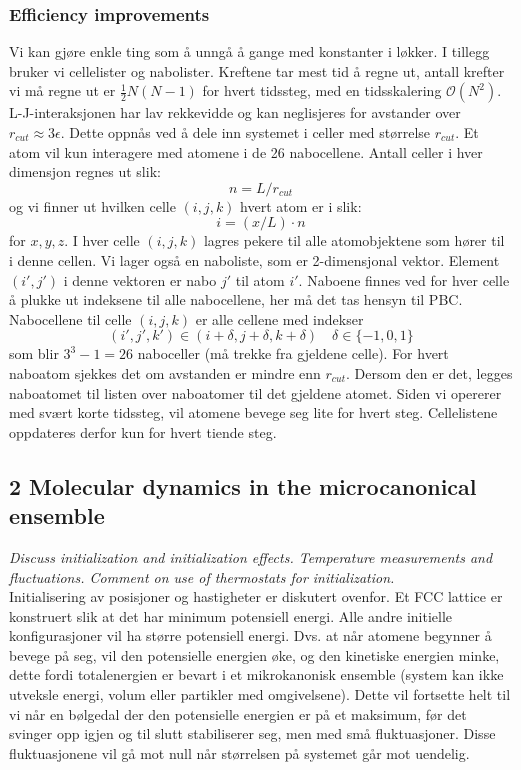 \documentclass[english, a4paper]{article}
\begin{document}
\subsubsection{Efficiency improvements}
Vi kan gjøre enkle ting som å unngå å gange med konstanter i løkker. 
I tillegg bruker vi cellelister og nabolister. Kreftene tar mest tid å regne ut, antall krefter
vi må regne ut er $\frac{1}{2}N(N-1)$ for hvert tidssteg, med en tidsskalering $\mathcal{O}(N^2)$.
L-J-interaksjonen har lav rekkevidde og kan neglisjeres for avstander over $r_{cut} \approx 3\epsilon$.
Dette oppnås ved å dele inn systemet i celler med størrelse $r_{cut}$. Et atom vil kun interagere
med atomene i de 26 nabocellene. Antall celler i hver dimensjon regnes ut slik:
\begin{equation}
 n = L/r_{cut}
\end{equation}
og vi finner ut hvilken celle $(i,j,k)$ hvert atom er i slik:
\begin{equation}
 i = (x/L) \cdot n
\end{equation}
for $x, y, z$. I hver celle $(i,j,k)$ lagres pekere til alle atomobjektene som hører til i denne cellen. 
Vi lager også en naboliste, som er 2-dimensjonal vektor. Element $(i',j')$ i denne vektoren
er nabo $j'$ til atom $i'$. Naboene finnes ved for hver celle å plukke ut indeksene til alle
nabocellene, her må det tas hensyn til PBC. Nabocellene til celle $(i,j,k)$ er alle cellene med indekser
\begin{equation}
 (i',j',k') \in (i + \delta, j + \delta, k + \delta) \quad \delta \in \{-1,0,1\}
\end{equation}
som blir $3^3 - 1  = 26$ naboceller (må trekke fra gjeldene celle). For hvert naboatom
sjekkes det om avstanden er mindre enn $r_{cut}$. Dersom den er det, legges naboatomet til listen 
over naboatomer til det gjeldene atomet. Siden vi opererer med svært korte tidssteg, vil atomene bevege seg
lite for hvert steg. Cellelistene oppdateres derfor kun for hvert tiende steg. 


\subsection{2 Molecular dynamics in the microcanonical ensemble}
\textit{Discuss initialization and initialization effects. Temperature measurements and fluctuations.
Comment on use of thermostats for initialization.} \\

\noindent
Initialisering av posisjoner og hastigheter er diskutert ovenfor. Et FCC lattice er konstruert slik at
det har minimum potensiell energi. Alle andre initielle konfigurasjoner vil ha større potensiell energi. 
Dvs. at når atomene begynner å bevege på seg, vil den potensielle energien øke, og den kinetiske energien
minke, dette fordi totalenergien er bevart i et mikrokanonisk ensemble (system kan ikke utveksle
energi, volum eller partikler med omgivelsene). Dette vil fortsette helt til vi når en bølgedal der den 
potensielle energien er på et maksimum, før det svinger opp igjen og til slutt stabiliserer seg, men med små
fluktuasjoner. Disse fluktuasjonene vil gå mot null når størrelsen på systemet går mot uendelig. \\
\end{document}
